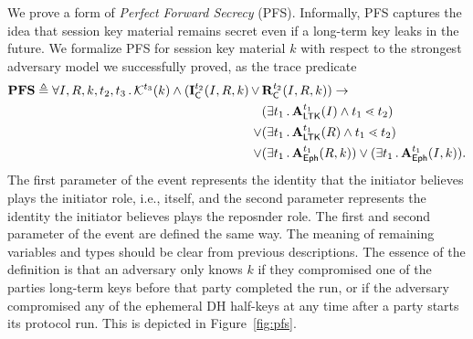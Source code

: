 {%
We prove a form of \emph{Perfect Forward Secrecy} (PFS).
%
Informally, PFS captures the idea that session key material remains secret
even if a long-term key leaks in the future.
%
We formalize PFS for session key material $k$ with respect to the strongest
adversary model we successfully proved, as the trace predicate
%
\begin{align*}
    \mPredPfs \triangleq
    \forall I, R, k, t_2, t_3\mLogicDot
    \mK^{t_3}(k) \land (\mIComplete^{t_2}(I, R, k)\, \lor\, & \mRComplete^{t_2}(I, R, k))
    \rightarrow\\
    &(\exists t_1\mLogicDot \mRevLTK^{t_1}(I) \land t_1 \lessdot t_2)\\
    \lor&(\exists t_1\mLogicDot \mRevLTK^{t_1}(R) \land t_1 \lessdot t_2)\\
    \lor&(\exists t_1\mLogicDot \mRevEph^{t_1}(R, k))
    \lor(\exists t_1\mLogicDot \mRevEph^{t_1}(I, k)).
\end{align*}
%
The first parameter of the \mIComplete{} event represents the
identity that the initiator believes plays the initiator role, i.e., itself,
and the second parameter represents the identity the initiator believes plays
the reposnder role.
%
The first and second parameter of the \mRComplete{} event are defined the same
way.
%
The meaning of remaining variables and types should be clear from previous
descriptions.
%
The essence of the definition is that an adversary only knows $k$ if they
compromised one of the
parties long-term keys before that party completed the run, or if the adversary
compromised any of the ephemeral DH half-keys at any time after a party starts
its protocol run.
%
This is depicted in Figure~\ref{fig:pfs}.
%
\begin{figure}[h!]
    \begin{center}
        \tikzset{>=latex}
        \begin{tikzpicture}

\end{tikzpicture}
\end{center}
\end{figure}}
